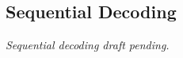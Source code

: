 \subsection{Sequential Decoding}
\label{sec:sequential-decoding}
\textit{Sequential decoding draft pending.}
